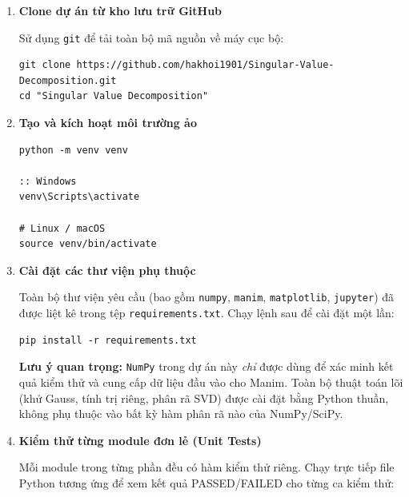 \begin{enumerate}

    \item \textbf{Clone dự án từ kho lưu trữ GitHub}

    Sử dụng \texttt{git} để tải toàn bộ mã nguồn về máy cục bộ:
\begin{tcolorbox}[mycodebox]
\begin{verbatim}
git clone https://github.com/hakhoi1901/Singular-Value-Decomposition.git
cd "Singular Value Decomposition"
\end{verbatim}
\end{tcolorbox}

    \item \textbf{Tạo và kích hoạt môi trường ảo}

\begin{tcolorbox}[mycodebox]
\begin{verbatim}
python -m venv venv

:: Windows
venv\Scripts\activate

# Linux / macOS
source venv/bin/activate
\end{verbatim}
\end{tcolorbox}

    \item \textbf{Cài đặt các thư viện phụ thuộc}

    Toàn bộ thư viện yêu cầu (bao gồm \texttt{numpy}, \texttt{manim}, \texttt{matplotlib}, \texttt{jupyter}) đã được
    liệt kê trong tệp \texttt{requirements.txt}. Chạy lệnh sau để cài đặt một lần:
\begin{tcolorbox}[mycodebox]
\begin{verbatim}
pip install -r requirements.txt
\end{verbatim}
\end{tcolorbox}

    \textbf{Lưu ý quan trọng:} \texttt{NumPy} trong dự án này \emph{chỉ} được dùng để xác minh kết quả kiểm thử
    và cung cấp dữ liệu đầu vào cho Manim. Toàn bộ thuật toán lõi (khử Gauss, tính trị riêng, phân rã SVD)
    được cài đặt bằng Python thuần, không phụ thuộc vào bất kỳ hàm phân rã nào của NumPy/SciPy.

    \item \textbf{Kiểm thử từng module đơn lẻ (Unit Tests)}

    Mỗi module trong từng phần đều có hàm kiểm thử riêng. Chạy trực tiếp file Python tương ứng
    để xem kết quả PASSED/FAILED cho từng ca kiểm thử:


\end{enumerate}
